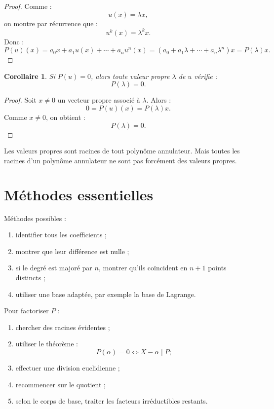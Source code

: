 \documentclass[11pt,a4paper]{article}
\newtheorem{corollaire}[prop]{Corollaire}
\begin{document}
\begin{proof}
Comme :
\[
u(x)=\lambda x,
\]
on montre par récurrence que :
\[
u^k(x)=\lambda^kx.
\]
Donc :
\[
P(u)(x)
=
a_0x+a_1u(x)+\cdots+a_nu^n(x)
=
(a_0+a_1\lambda+\cdots+a_n\lambda^n)x
=
P(\lambda)x.
\]
\end{proof}

\begin{corollaire}
Si \(P(u)=0\), alors toute valeur propre \(\lambda\) de \(u\) vérifie :
\[
P(\lambda)=0.
\]
\end{corollaire}

\begin{proof}
Soit \(x\neq0\) un vecteur propre associé à \(\lambda\).  
Alors :
\[
0=P(u)(x)=P(\lambda)x.
\]
Comme \(x\neq0\), on obtient :
\[
P(\lambda)=0.
\]
\end{proof}

\begin{erreurbox}
Les valeurs propres sont racines de tout polynôme annulateur.  
Mais toutes les racines d'un polynôme annulateur ne sont pas forcément des valeurs propres.
\end{erreurbox}

\section{Méthodes essentielles}

\begin{methodbox}
Méthodes possibles :
\begin{enumerate}
    \item identifier tous les coefficients ;
    \item montrer que leur différence est nulle ;
    \item si le degré est majoré par \(n\), montrer qu'ils coïncident en \(n+1\) points distincts ;
    \item utiliser une base adaptée, par exemple la base de Lagrange.
\end{enumerate}
\end{methodbox}

\begin{methodbox}
Pour factoriser \(P\) :
\begin{enumerate}
    \item chercher des racines évidentes ;
    \item utiliser le théorème :
    \[
    P(\alpha)=0\Longleftrightarrow X-\alpha\mid P ;
    \]
    \item effectuer une division euclidienne ;
    \item recommencer sur le quotient ;
    \item selon le corps de base, traiter les facteurs irréductibles restants.
\end{enumerate}
\end{methodbox}
\end{document}
